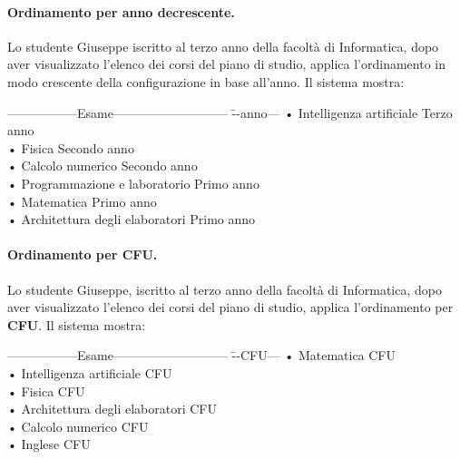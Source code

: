 \paragraph{Ordinamento per anno decrescente.}
Lo studente Giuseppe iscritto al terzo anno della facoltà di Informatica, dopo aver visualizzato l'elenco dei corsi del piano di studio, applica l'ordinamento in modo crescente della configurazione in base all’anno. Il sistema mostra:

\begin{tabbing}
\hspace{1cm}-----------------Esame--------------------------- \= --anno---\kill
\hspace{1cm} • Intelligenza artificiale	 \>Terzo anno \\
\hspace{1cm} • Fisica \> Secondo anno \\
\hspace{1cm} • Calcolo numerico \>Secondo anno \\	
\hspace{1cm} • Programmazione e laboratorio \> Primo anno \\
\hspace{1cm} • Matematica \> Primo anno \\
\hspace{1cm} • Architettura degli elaboratori \> Primo anno \\
\end{tabbing}

\paragraph{Ordinamento per CFU.}
Lo studente Giuseppe, iscritto al terzo anno della facoltà di Informatica, dopo aver visualizzato l’elenco dei corsi del piano di studio, applica l’ordinamento per \textbf{CFU}. Il sistema mostra:

\begin{tabbing}
	\hspace{1cm}-----------------Esame--------------------------- \= --CFU---\kill
	\hspace{1cm} • Matematica  CFU \\
	\hspace{1cm} • Intelligenza artificiale	  CFU \\
	\hspace{1cm} • Fisica  CFU \\
	\hspace{1cm} • Architettura degli elaboratori  CFU  \\
	\hspace{1cm} • Calcolo numerico  CFU \\	
	\hspace{1cm} • Inglese  CFU  \\	
	
\end{tabbing}

